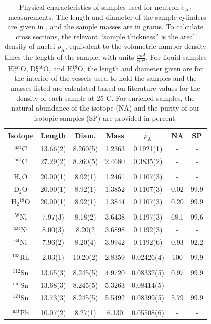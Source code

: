 \documentclass[twocolumn,secnumarabic,amssymb, nobibnotes, aps, prl,
superscriptaddress, nobalancelastpage]{revtex4}
\newcommand{\tot}{\ensuremath{\sigma_{tot}}}
\begin{document}
\begin{table}[tb]
    \centering
    \begin{tabular}{c c c c c c c}
        \small Isotope & Length & Diam. & Mass & $\rho_{\text{A}}$ & NA & SP\\
        \hline
        $^{\text{nat}}$C& 13.66(2)& 8.260(5)& 1.2363& 0.1921(1)& -& -\\
        $^{\text{nat}}$C& 27.29(2)& 8.260(5)& 2.4680& 0.3835(2)& -& -\\
        \\
        H$_{2}$O& 20.00(1)& 8.92(1)& 1.2461& 0.1107(3)& -& - \\
        D$_{2}$O& 20.00(1)& 8.92(1)& 1.3852& 0.1107(3)& 0.02& 99.9\\
        H$_{2}$$^{18}$O& 20.00(1)& 8.92(1)& 1.3844& 0.1107(3)& 0.20& 99.9\\
        \\
        $^{58}$Ni& 7.97(3)& 8.18(2)& 3.6438& 0.1197(3)& 68.1& 99.6 \\
        $^{\text{nat}}$Ni& 8.00(3)& 8.20(2 & 3.6898& 0.1192(3)& - & -\\
        $^{64}$Ni& 7.96(2)& 8.20(4)& 3.9942& 0.1192(6)& 0.93& 92.2\\
        \\
        $^{103}$Rh& 2.03(1)& 10.20(2)& 2.8359& 0.02426(4)& 100& 99.9\\
        \\
        $^{112}$Sn& 13.65(3)& 8.245(5)& 4.9720& 0.08332(5)& 0.97& 99.9\\
        $^{\text{nat}}$Sn& 13.68(3)& 8.245(5)& 5.3263& 0.08414(5)& - & -\\
        $^{124}$Sn& 13.73(3)& 8.245(5)& 5.5492& 0.08399(5)& 5.79& 99.9\\
        \\
        $^{\text{nat}}$Pb& 10.07(2)& 8.27(1)& 6.130& 0.05508(6)& -& -\\
        \hline
    \end{tabular}
    \centering
    \caption{Physical characteristics of samples used for neutron \tot\ measurements.
        The length and diameter of the sample cylinders are given in
        \milli\meter, and the sample masses are in grams. To calculate cross sections, the relevant
        ``sample thickness'' is the areal density of nuclei
        $\rho_{\text{A}}$, equivalent to the volumetric number density times
        the length of the sample, with units $\frac{mol}{cm^{2}_{ }}$. For liquid
        samples H$_{2}^{\text{nat}}$O, D$_{2}^{\text{nat}}$O, and H$_{2}^{18}$O,
        the length and diameter given are for the interior of the vessels
        used to hold the samples and the masses listed are calculated based on 
        literature values for the density of each sample at 25 C.
        For enriched samples, the natural abundance of the
        isotope (NA) and the purity of our isotopic samples (SP) are provided in
    percent.}
    \label{SampleCharacteristics}
\end{table}
\end{document}
